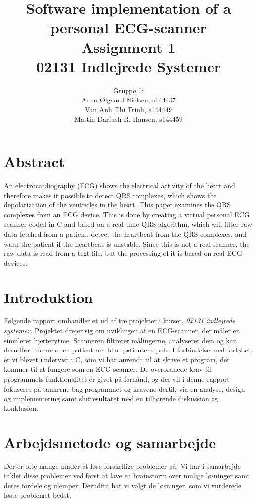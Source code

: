 \documentclass{article}
\title{\huge Software implementation of a personal ECG-scanner \\ \LARGE Assignment 1 \\ \LARGE 02131 Indlejrede Systemer}
\author{Gruppe 1: \\Anna Ølgaard Nielsen, s144437 \\ Van Anh Thi Trinh, s144449 \\ Martin Dariush R. Hansen, s144459}
\date{\myfont \displaydate{date}}
\begin{document}
\maketitle

\newpage

\section*{Abstract}
An electrocardiography (ECG) shows the electrical activity of the heart and therefore makes it possible to detect QRS complexes, which shows the depolarization of the ventricles in the heart\cite{3}. This paper examines the QRS complexes from an ECG device. This is done by creating a virtual personal ECG scanner coded in C and based on a real-time QRS algorithm, which will filter raw data fetched from a patient, detect the heartbeat from the QRS complexes\cite{1}, and warn the patient if the heartbeat is unstable. Since this is not a real scanner, the raw data is read from a text file, but the processing of it is based on real ECG devices.

\tableofcontents

\newpage
\section{Introduktion}
Følgende rapport omhandler et ud af tre projekter i kurset, \textit{02131 indlejrede systemer}. Projektet drejer sig om uviklingen af en ECG-scanner, der måler en simuleret hjerterytme. Scanneren filtrerer målingerne, analyserer dem og kan derudfra informere en patient om bl.a. patientens puls. I forbindelse med forløbet, er vi blevet undervist i C, som vi har anvendt til at skrive et program, der kommer til at fungere som en ECG-scanner. De overordnede krav til programmets funktionalitet er givet på forhånd, og der vil i denne rapport fokuseres på tankerne bag programmet og kravene dertil, via en analyse, design og implementering samt slutresultatet med en tilhørende diskussion og konklusion.


\newpage
\section{Arbejdsmetode og samarbejde}
Der er ofte mange måder at løse forskellige problemer på. Vi har i samarbejde taklet disse problemer ved først at lave en brainstorm over mulige løsninger samt deres fordele og ulemper. Derudfra har vi valgt de løsninger, som vi vurderede løste problemet bedst.
\end{document}
